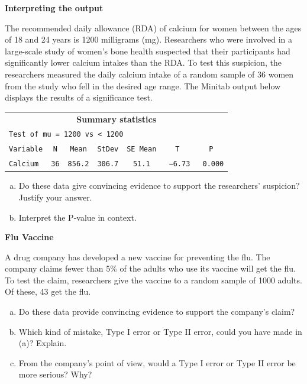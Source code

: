 \documentclass[a4paper, 12pt,twoside]{book}
\begin{document}
\colorbox{champagne}{\parbox{\textwidth}{
\textbf{Interpreting the output}\vspace{0.3cm}

The recommended daily allowance (RDA) of calcium for women between the ages of 18 and 24 years is 1200 milligrams (mg). Researchers who were involved in a large-scale study of women’s bone health suspected that their participants had significantly lower calcium intakes than the RDA. To test this suspicion, the researchers measured the daily calcium intake of a random sample of 36 women from the study who fell in the desired age range. The Minitab output below displays the results of a significance test.\vspace{0.3cm}

    \begin{table}[H]
    \centering
       \begin{tabular}{|lcccccc|}
       \hline
       \multicolumn{7}{|c|}{\textbf{Summary statistics}}\\
       \multicolumn{7}{|l|}{\texttt{Test of mu = 1200 vs < 1200}}\\
       \texttt{Variable}& \texttt{N}& \texttt{Mean}&\texttt{StDev}&\texttt{SE Mean}&\texttt{T}&\texttt{P}\\
       \texttt{Calcium}&\texttt{36}&\texttt{856.2}&\texttt{306.7}&\texttt{51.1}&\texttt{ −6.73}&\texttt{ 0.000}\\  
       \hline   
       \end{tabular}
    \end{table}
    
    \begin{enumerate}[(a)]
       \item Do these data give convincing evidence to support the researchers’ suspicion? Justify your answer.
       \item Interpret the P-value in context.
    \end{enumerate}
}}

\newpage
\colorbox{champagne}{\parbox{\textwidth}{
\textbf{Flu Vaccine}\vspace{0.3cm}

A drug company has developed a new vaccine for preventing the flu. The company claims fewer than 5\% of the adults who use its vaccine will get the flu. To test the claim, researchers give the vaccine to a random sample of 1000 adults. Of these, 43 get the flu.
  \begin{enumerate}[(a)]
      \item Do these data provide convincing evidence to support the company’s claim?
      \item Which kind of mistake, Type I error or  Type II error, could you have made in (a)? Explain.
      \item From the company’s point of view, would a Type I error or Type II error be more serious? Why?
  \end{enumerate}
}}
\newpage
\end{document}

